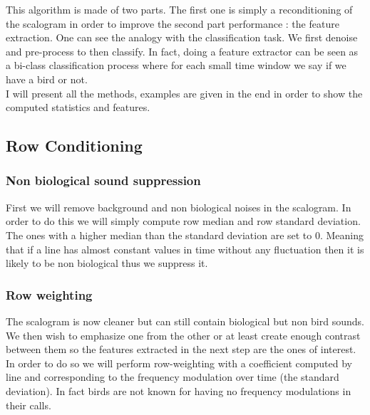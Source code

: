 \documentclass[a4paper]{report}
\begin{document}
This algorithm is made of two parts. The first one is simply a reconditioning of the scalogram in order to improve the second part performance : the feature extraction. One can see the analogy with the classification task. We first denoise and pre-process to then classify. In fact, doing a feature extractor can be seen as a bi-class classification process where for each small time window we say if we have a bird or not.
\\
I will present all the methods, examples are given in the end in order to show the computed statistics and features.
\subsection{Row Conditioning}
\subsubsection{Non biological sound suppression}
First we will remove background and non biological noises in the scalogram. In order to do this we will simply compute row median and row standard deviation. The ones with a higher median than the standard deviation are set to $0$. Meaning that if a line has almost constant values in time without any fluctuation then it is likely to be non biological thus we suppress it.
\subsubsection{Row weighting}
The scalogram is now cleaner but can still contain biological but non bird sounds. We then wish to emphasize one from the other or at least create enough contrast between them so the features extracted in the next step are the ones of interest. In order to do so we will perform row-weighting with a coefficient computed by line and corresponding to the frequency modulation over time (the standard deviation). In fact birds are not known for having no frequency modulations in their calls.
\end{document}
